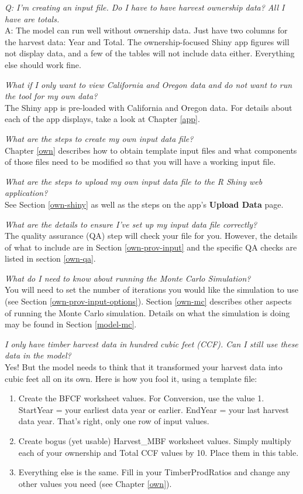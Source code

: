 \documentclass[
  openany]{book}
\providecommand{\tightlist}{%
  \setlength{\itemsep}{0pt}\setlength{\parskip}{0pt}}
\begin{document}
\emph{Q: I'm creating an input file. Do I have to have harvest ownership data? All I have are totals.}\\
A: The model can run well without ownership data. Just have two columns for the harvest data: Year and Total. The ownership-focused Shiny app figures will not display data, and a few of the tables will not include data either. Everything else should work fine.

\emph{What if I only want to view California and Oregon data and do not want to run the tool for my own data?}\\
The Shiny app is pre-loaded with California and Oregon data. For details about each of the app displays, take a look at Chapter \ref{app}.

\emph{What are the steps to create my own input data file?}\\
Chapter \ref{own} describes how to obtain template input files and what components of those files need to be modified so that you will have a working input file.

\emph{What are the steps to upload my own input data file to the R Shiny web application?}\\
See Section \ref{own-shiny} as well as the steps on the app's \textbf{Upload Data} page.

\emph{What are the details to ensure I've set up my input data file correctly? }\\
The quality assurance (QA) step will check your file for you. However, the details of what to include are in Section \ref{own-prov-input} and the specific QA checks are listed in section \ref{own-qa}.

\emph{What do I need to know about running the Monte Carlo Simulation? }\\
You will need to set the number of iterations you would like the simulation to use (see Section \ref{own-prov-input-options}). Section \ref{own-mc} describes other aspects of running the Monte Carlo simulation. Details on what the simulation is doing may be found in Section \ref{model-mc}.

\emph{I only have timber harvest data in hundred cubic feet (CCF). Can I still use these data in the model?}\\
Yes! But the model needs to think that it transformed your harvest data into cubic feet all on its own. Here is how you fool it, using a template file:

\begin{enumerate}
\def\labelenumi{\arabic{enumi}.}
\tightlist
\item
  Create the BFCF worksheet values. For Conversion, use the value 1. StartYear = your earliest data year or earlier. EndYear = your last harvest data year. That's right, only one row of input values.\\
\item
  Create bogus (yet usable) Harvest\_MBF worksheet values. Simply multiply each of your ownership and Total CCF values by 10. Place them in this table.\\
\item
  Everything else is the same. Fill in your TimberProdRatios and change any other values you need (see Chapter \ref{own}).
\end{enumerate}
\end{document}
